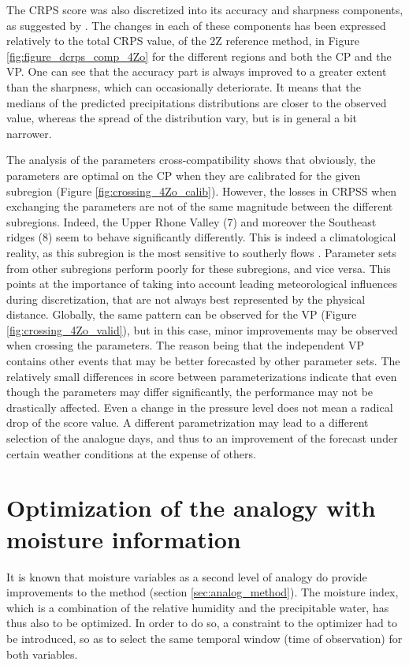 \documentclass[5p]{elsarticle}
\begin{document}
The CRPS score was also discretized into its accuracy and sharpness components, as suggested by \citet{Bontron2004}. The changes in each of these components has been expressed relatively to the total CRPS value, of the 2Z reference method, in Figure \ref{fig:figure_dcrps_comp_4Zo} for the different regions and both the CP and the VP. One can see that the accuracy part is always improved to a greater extent than the sharpness, which can occasionally deteriorate. It means that the medians of the predicted precipitations distributions are closer to the observed value, whereas the spread of the distribution vary, but is in general a bit narrower.

The analysis of the parameters cross-compatibility shows that obviously, the parameters are optimal on the CP when they are calibrated for the given subregion (Figure \ref{fig:crossing_4Zo_calib}). However, the losses in CRPSS when exchanging the parameters are not of the same magnitude between the different subregions. Indeed, the Upper Rhone Valley (7) and moreover the Southeast ridges (8) seem to behave significantly differently. This is indeed a climatological reality, as this subregion is the most sensitive to southerly flows \citep{Horton2012}. Parameter sets from other subregions perform poorly for these subregions, and vice versa. This points at the importance of taking into account leading meteorological influences during discretization, that are not always best represented by the physical distance. Globally, the same pattern can be observed for the VP (Figure \ref{fig:crossing_4Zo_valid}), but in this case, minor improvements may be observed when crossing the parameters. The reason being that the independent VP contains other events that may be better forecasted by other parameter sets. The relatively small differences in score between parameterizations indicate that even though the parameters may differ significantly, the performance may not be drastically affected. Even a change in the pressure level does not mean a radical drop of the score value. A different parametrization may lead to a different selection of the analogue days, and thus to an improvement of the forecast under certain weather conditions at the expense of others.


\section{Optimization of the analogy with moisture information}
\label{sec:optim_moisture}

It is known that moisture variables as a second level of analogy do provide improvements to the method (section \ref{sec:analog_method}). The moisture index, which is a combination of the relative humidity and the precipitable water, has thus also to be optimized. In order to do so, a constraint to the optimizer had to be introduced, so as to select the same temporal window (time of observation) for both variables. 
\end{document}

